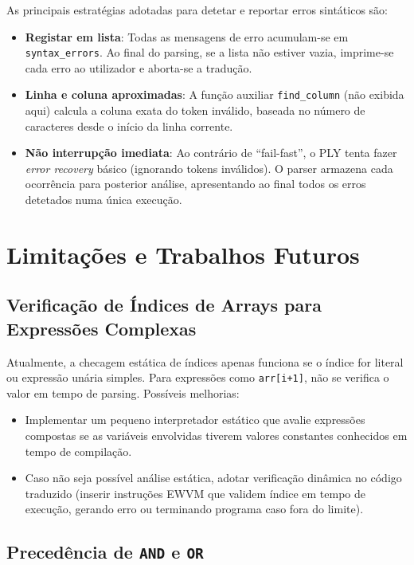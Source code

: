 As principais estratégias adotadas para detetar e reportar erros sintáticos são:

\begin{itemize}
    \item \textbf{Registar em lista}: Todas as mensagens de erro acumulam-se em \texttt{syntax\_errors}. Ao final do parsing, se a lista não estiver vazia, imprime-se cada erro ao utilizador e aborta-se a tradução.
    \item \textbf{Linha e coluna aproximadas}: A função auxiliar \texttt{find\_column} (não exibida aqui) calcula a coluna exata do token inválido, baseada no número de caracteres desde o início da linha corrente.  
    \item \textbf{Não interrupção imediata}: Ao contrário de “fail-fast”, o PLY tenta fazer \emph{error recovery} básico (ignorando tokens inválidos). O parser armazena cada ocorrência para posterior análise, apresentando ao final todos os erros detetados numa única execução.
\end{itemize}

\section{Limitações e Trabalhos Futuros}

\subsection{Verificação de Índices de Arrays para Expressões Complexas}

Atualmente, a checagem estática de índices apenas funciona se o índice for literal ou expressão unária simples. Para expressões como \texttt{arr[i+1]}, não se verifica o valor em tempo de parsing. Possíveis melhorias:

\begin{itemize}
    \item Implementar um pequeno interpretador estático que avalie expressões compostas se as variáveis envolvidas tiverem valores constantes conhecidos em tempo de compilação.
    \item Caso não seja possível análise estática, adotar verificação dinâmica no código traduzido (inserir instruções EWVM que validem índice em tempo de execução, gerando erro ou terminando programa caso fora do limite).
\end{itemize}

\subsection{Precedência de \texttt{AND} e \texttt{OR}}


